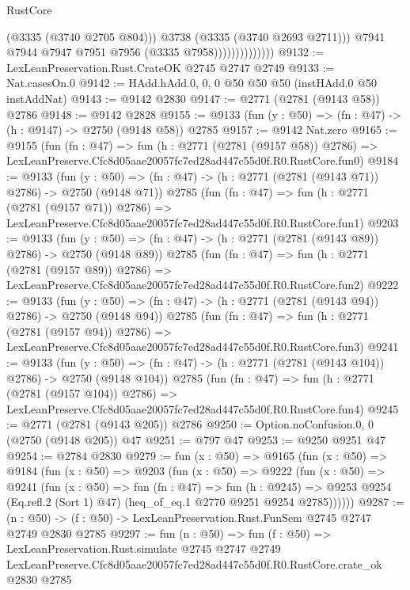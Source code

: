 \begin{lexlean}{RustCore}
\begin{coremodule}
                                  (@3335 (@3740 @2705 @804)))
                                @3738
                                (@3335 (@3740 @2693 @2711)))
                              @7941
                              @7944
                              @7947
                              @7951
                              @7956
                              (@3335 @7958))))))))))))))
@9132 := LexLeanPreservation.Rust.CrateOK @2745 @2747 @2749
@9133 := Nat.casesOn.{0}
@9142 := HAdd.hAdd.{0, 0, 0} @50 @50 @50 (instHAdd.{0} @50 instAddNat)
@9143 := @9142 @2830
@9147 := @2771 (@2781 (@9143 @58)) @2786
@9148 := @9142 @2828
@9155 := @9133 (fun (y : @50) => (fn : @47) -> (h : @9147) -> @2750 (@9148 @58)) @2785
@9157 := @9142 Nat.zero
@9165 := @9155
    (fun (fn : @47) =>
    fun (h : @2771 (@2781 (@9157 @58)) @2786) =>
    LexLeanPreserve.Cfc8d05aae20057fc7ed28ad447c55d0f.R0.RustCore.fun0)
@9184 := @9133
    (fun (y : @50) => (fn : @47) -> (h : @2771 (@2781 (@9143 @71)) @2786) -> @2750 (@9148 @71))
    @2785
    (fun (fn : @47) =>
    fun (h : @2771 (@2781 (@9157 @71)) @2786) =>
    LexLeanPreserve.Cfc8d05aae20057fc7ed28ad447c55d0f.R0.RustCore.fun1)
@9203 := @9133
    (fun (y : @50) => (fn : @47) -> (h : @2771 (@2781 (@9143 @89)) @2786) -> @2750 (@9148 @89))
    @2785
    (fun (fn : @47) =>
    fun (h : @2771 (@2781 (@9157 @89)) @2786) =>
    LexLeanPreserve.Cfc8d05aae20057fc7ed28ad447c55d0f.R0.RustCore.fun2)
@9222 := @9133
    (fun (y : @50) => (fn : @47) -> (h : @2771 (@2781 (@9143 @94)) @2786) -> @2750 (@9148 @94))
    @2785
    (fun (fn : @47) =>
    fun (h : @2771 (@2781 (@9157 @94)) @2786) =>
    LexLeanPreserve.Cfc8d05aae20057fc7ed28ad447c55d0f.R0.RustCore.fun3)
@9241 := @9133
    (fun (y : @50) => (fn : @47) -> (h : @2771 (@2781 (@9143 @104)) @2786) -> @2750 (@9148 @104))
    @2785
    (fun (fn : @47) =>
    fun (h : @2771 (@2781 (@9157 @104)) @2786) =>
    LexLeanPreserve.Cfc8d05aae20057fc7ed28ad447c55d0f.R0.RustCore.fun4)
@9245 := @2771 (@2781 (@9143 @205)) @2786
@9250 := Option.noConfusion.{0, 0} (@2750 (@9148 @205)) @47
@9251 := @797 @47
@9253 := @9250 @9251 @47
@9254 := @2784 @2830
@9279 := fun (x : @50) =>
  @9165
    (fun (x : @50) =>
    @9184
      (fun (x : @50) =>
      @9203
        (fun (x : @50) =>
        @9222
          (fun (x : @50) =>
          @9241
            (fun (x : @50) =>
            fun (fn : @47) =>
            fun (h : @9245) =>
            @9253 @9254 (Eq.refl.{2} (Sort 1) @47) (heq_of_eq.{1} @2770 @9251 @9254 @2785))))))
@9287 := (n : @50) -> (f : @50) -> LexLeanPreservation.Rust.FunSem @2745 @2747 @2749 @2830 @2785
@9297 := fun (n : @50) =>
  fun (f : @50) =>
  LexLeanPreservation.Rust.simulate
    @2745
    @2747
    @2749
    LexLeanPreserve.Cfc8d05aae20057fc7ed28ad447c55d0f.R0.RustCore.crate_ok
    @2830
    @2785
\end{coremodule}
\end{lexlean}
